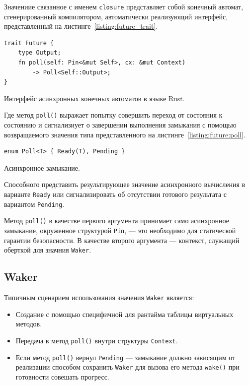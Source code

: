 Значениие связанное с именем \verb|closure| представляет собой конечный автомат, сгенерированный компилятором, автоматически реализующий интерфейс, представленный на листинге~\ref{listing:future_trait}.

\begin{listing}[H]
    \begin{verbatim}
trait Future {
    type Output;
    fn poll(self: Pin<&mut Self>, cx: &mut Context)
        -> Poll<Self::Output>;
}
    \end{verbatim}

    \caption{Интерфейс асинхронных конечных автоматов в языке Rust.}
    \label{listing:future_trait}
\end{listing}

Где метод \verb|poll()| выражает попытку совершить переход от состояния к состоянию и сигнализиует о завершении выполнения замыкания с помощью возвращаемого значения типа представленного на листинге~\ref{listing:future:poll}.

\begin{listing}[H]
    \begin{verbatim}
enum Poll<T> { Ready(T), Pending }
    \end{verbatim}

    \caption{Асинхронное замыкание.}
    \label{listing:future:poll}
\end{listing}

Способного представить результирующее значение асинхронного вычисления в варианте \verb|Ready| или сигнализировать об отсутствии готового результата с вариантом \verb|Pending|.

Метод \verb|poll()| в качестве первого аргумента принимает само асинхронное замыкание, окруженное структурой \verb|Pin|, --- это необходимо для статической гарантии безопасности. В качестве второго аргумента --- контекст, служащий оберткой для значния \verb|Waker|.

\subsection{Waker}

Типичным сценарием использования значения \verb|Waker| является:

\begin{itemize}
    \item Создание с помощью специфичной для рантайма таблицы виртуальных методов.
    \item Передача в метод \verb|poll()| внутри структуры \verb|Context|.
    \item Если метод \verb|poll()| вернул \verb|Pending| --- замыкание должно зависящим от реализации способом сохранить \verb|Waker| для вызова его метода \verb|wake()| при готовности совешать прогресс.
\end{itemize}

